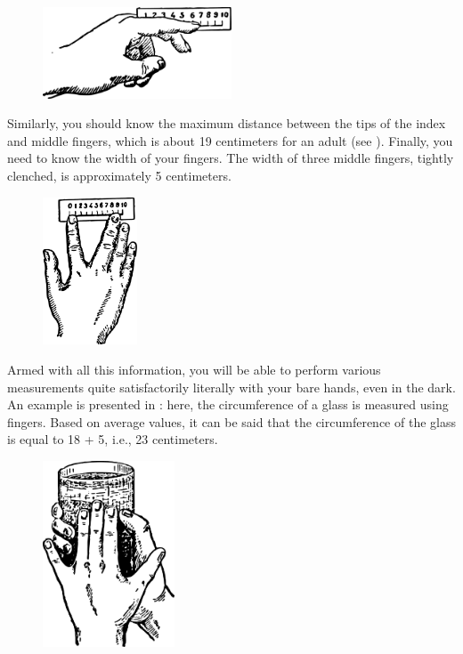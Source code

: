 \begin{figure}[h!]
\centering
\includegraphics[width=0.5\textwidth]{figures/ch-08/fig-119.pdf}
\end{figure}


Similarly, you should know the maximum distance between the tips of the index and middle fingers, which is about 19 centimeters for an adult (see ). Finally, you need to know the width of your fingers. The width of three middle fingers, tightly clenched, is approximately 5 centimeters.

\begin{figure}[h!]
\centering
\includegraphics[width=0.25\textwidth]{figures/ch-08/fig-120.pdf}
\end{figure}


Armed with all this information, you will be able to perform various measurements quite satisfactorily literally with your bare hands, even in the dark. An example is presented in : here, the circumference of a glass is measured using fingers. Based on average values, it can be said that the circumference of the glass is equal to 18 + 5, i.e., 23 centimeters.


\begin{figure}[h!]
\centering
\includegraphics[width=0.35\textwidth]{figures/ch-08/fig-121.pdf}
\end{figure}


